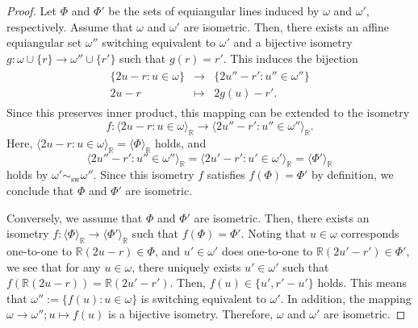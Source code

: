 \documentclass[reqno, 11pt]{amsart}
\numberwithin{equation}{section}
\theoremstyle{definition}
\DeclareMathOperator{\sw}{sw}
\newcommand{\aes}{\omega}
\newcommand{\R}{\mathbb{R}}
\begin{document}
\begin{proof}
	Let $\Phi$ and $\Phi'$ be the sets of equiangular lines induced by $\aes$ and $\aes'$, respectively.
	Assume that $\aes$ and $\aes'$ are isometric.
	Then, there exists an affine equiangular set $\aes''$ switching equivalent to $\aes'$ and a bijective isometry $g : \aes \cup \{r \} \to \aes'' \cup \{r' \}$ such that $g(r) = r'$.
	This induces the bijection
	\begin{align*}
		\begin{array}{ccc}
			\{ 2u-r : u \in \aes \} & \to     & \{ 2u''-r' : u'' \in \aes'' \} \\
			2u-r                    & \mapsto & 2g(u)-r'.
		\end{array}
	\end{align*}
	Since this preserves inner product,
	this mapping can be extended to the isometry $$f : \langle 2u-r : u \in \aes \rangle_{\R} \to \langle  2u''-r' : u'' \in \aes'' \rangle_{\R}.$$
	Here, $\langle 2u - r : u \in \aes \rangle_{\R} = \langle \Phi \rangle_{\R}$ holds, and 
	$$\langle 2u'' - r' : u'' \in \aes'' \rangle_{\R} = \langle 2u' - r' : u' \in \aes' \rangle_{\R} = \langle \Phi' \rangle_{\R}$$ holds by $\aes' \sim_{\sw} \aes''$.
	Since this isometry $f$ satisfies $f(\Phi) = \Phi'$ by definition, we conclude that $\Phi$ and $\Phi'$ are isometric.

	Conversely, we assume that $\Phi$ and $\Phi'$ are isometric.
	Then, there exists an isometry $f : \langle \Phi \rangle_{\R} \to \langle \Phi' \rangle_{\R}$ such that $f(\Phi) = \Phi'$.
	Noting that $u \in \aes$ corresponds one-to-one to $\R(2u-r) \in \Phi$, and $u' \in \aes'$ does one-to-one to $\R(2u'-r') \in \Phi'$, we see that for any $u \in \aes$, there uniquely exists $u' \in \aes'$ such that $f(\R(2u-r)) = \R(2u'-r')$.
	Then,
	$
		f(u) \in \{ u' , r' - u' \}
	$
	holds.
	This means that $\aes'' := \{ f(u) : u \in \aes \}$ is switching equivalent to $\aes'$.
	In addition, the mapping $\aes \to \aes'' ; u \mapsto f(u)$ is a bijective isometry.
	Therefore, $\aes$ and $\aes'$ are isometric.
\end{proof}
\end{document}
